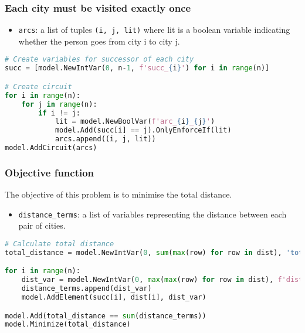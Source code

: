\documentclass{article}
\begin{document}
\subsubsection{Each city must be visited exactly once}
\begin{itemize}
    \item \verb |arcs|: a list of tuples \verb|(i, j, lit)| where lit is a boolean variable indicating whether the person goes from city i to city j.
\end{itemize}
\pagebreak
\begin{lstlisting}[language=Python]
# Create variables for successor of each city
succ = [model.NewIntVar(0, n-1, f'succ_{i}') for i in range(n)]

# Create circuit
for i in range(n):
    for j in range(n):
        if i != j:
            lit = model.NewBoolVar(f'arc_{i}_{j}')
            model.Add(succ[i] == j).OnlyEnforceIf(lit)
            arcs.append((i, j, lit))
model.AddCircuit(arcs)

\end{lstlisting}

\subsubsection{Objective function}
The objective of this problem is to minimise the total distance.
\begin{itemize}
    \item \verb|distance_terms|: a list of variables representing the distance between each pair of cities.
\end{itemize}
\begin{lstlisting}[language=Python]
# Calculate total distance
total_distance = model.NewIntVar(0, sum(max(row) for row in dist), 'total_distance')

for i in range(n):
    dist_var = model.NewIntVar(0, max(max(row) for row in dist), f'dist_{i}')
    distance_terms.append(dist_var)
    model.AddElement(succ[i], dist[i], dist_var)

model.Add(total_distance == sum(distance_terms))
model.Minimize(total_distance)
\end{lstlisting}
\end{document}
